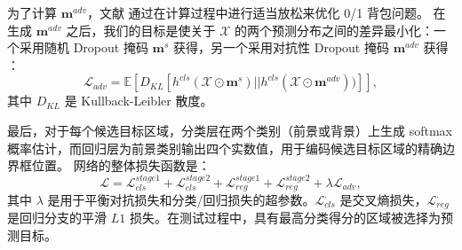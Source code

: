为了计算 $\mathbf{m}^{adv}$，文献 \cite{park2018adversarial} 通过在计算过程中进行适当放松来优化 0/1 背包问题。
在生成 $\mathbf{m}^{adv}$ 之后，我们的目标是使关于 $\mathcal{X}$ 的两个预测分布之间的差异最小化：一个采用随机 Dropout 掩码 $\mathbf{m}^{s}$ 获得，另一个采用对抗性 Dropout 掩码 $\mathbf{m}^{adv}$ 获得 \cite{lee2019drop}：
\begin{equation}
    \mathcal{L}_{adv} = \mathbb E[D_{KL}[h^{cls}(\mathcal{X} \odot\mathbf{m}^{s})||h^{cls}(\mathcal{X} \odot\mathbf{m}^{adv}))]],
\end{equation}
其中 $D_{KL}$ 是 Kullback-Leibler 散度。

最后，对于每个候选目标区域，分类层在两个类别（前景或背景）上生成 softmax 概率估计，而回归层为前景类别输出四个实数值，用于编码候选目标区域的精确边界框位置。
网络的整体损失函数是：
\begin{equation}
\mathcal{L} = \mathcal{L}_{cls}^{stage1} + \mathcal{L}_{cls}^{stage2} + \mathcal{L}_{reg}^{stage1}+\mathcal{L}_{reg}^{stage2} +  \lambda \mathcal{L}_{adv},
\end{equation}
其中 $\lambda$ 是用于平衡对抗损失和分类/回归损失的超参数。$\mathcal{L}_{cls}^{\cdot}$ 是交叉熵损失，$\mathcal{L}_{reg}^{\cdot}$ 是回归分支的平滑 $L1$ 损失。在测试过程中，具有最高分类得分的区域被选择为预测目标。

